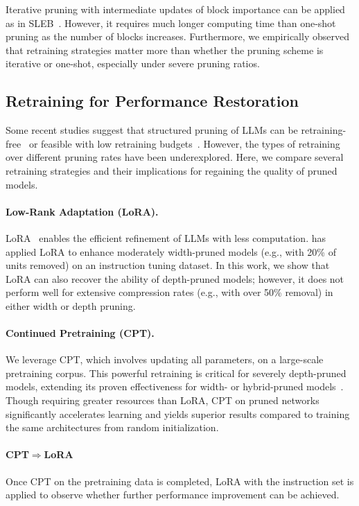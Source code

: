 Iterative pruning with intermediate updates of block importance can be applied as in SLEB~\cite{song2024sleb}. However, it requires much longer computing time than one-shot pruning as the number of blocks increases. Furthermore, we empirically observed that retraining strategies matter more than whether the pruning scheme is iterative or one-shot, especially under severe pruning ratios.

\subsection{Retraining for Performance Restoration}
Some recent studies suggest that structured pruning of LLMs can be retraining-free~\cite{song2024sleb,flap} or feasible with low retraining budgets~\cite{llmpruner}. However, the types of retraining over different pruning rates have been underexplored. Here, we compare several retraining strategies and their implications for regaining the quality of pruned models.

\paragraph{Low-Rank Adaptation (LoRA).} LoRA~\cite{lora} enables the efficient refinement of LLMs with less computation. \citet{llmpruner} has applied LoRA to enhance moderately width-pruned models (e.g., with 20\% of units removed) on an instruction tuning dataset. In this work, we show that LoRA can also recover the ability of depth-pruned models; however, it does not perform well for extensive compression rates (e.g., with over 50\% removal) in either width or depth pruning.

\paragraph{Continued Pretraining (CPT).} We leverage CPT, which involves updating all parameters, on a large-scale pretraining corpus. This powerful retraining is critical for severely depth-pruned models, extending its proven effectiveness for width- or hybrid-pruned models~\cite{xia2023sheared}. Though requiring greater resources than LoRA, CPT on pruned networks significantly accelerates learning and yields superior results compared to training the same architectures from random initialization.

\paragraph{CPT$\Rightarrow$LoRA} Once CPT on the pretraining data is completed, LoRA with the instruction set is applied to observe whether further performance improvement can be achieved.

